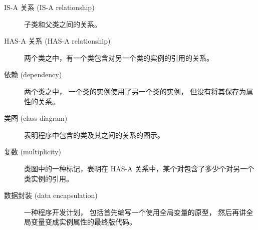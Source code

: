 \begin{description}

\item[IS-A 关系 (IS-A relationship)]  子类和父类之间的关系。


\item[HAS-A 关系 (HAS-A relationship)]  两个类之中，有一个类包含对另一个类的实例的引用的关系。


\item[依赖 (dependency)]  两个类之中， 一个类的实例使用了另一个类的实例， 但没有将其保存为属性的关系。


\item[类图 (class diagram)] 表明程序中包含的类及其之间的关系的图示。


\item[复数 (multiplicity)]  类图中的一种标记，表明在 HAS-A 关系中，某个对包含了多少个对另一个类实例的引用。


\item[数据封装 (data encapsulation)]  一种程序开发计划， 包括首先编写一个使用全局变量的原型， 然后再讲全局变量变成实例属性的最终版代码。

\end{description}

